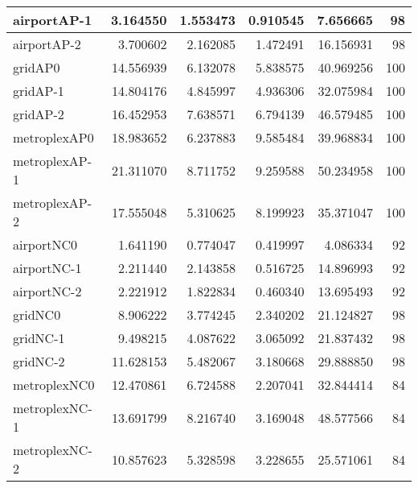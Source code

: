 \begin{longtable}{|l|r|r|r|r|r|}
airportAP-1 & 3.164550 & 1.553473 & 0.910545 & 7.656665 & 98 \\ \hline
airportAP-2 & 3.700602 & 2.162085 & 1.472491 & 16.156931 & 98 \\ \hline
gridAP0 & 14.556939 & 6.132078 & 5.838575 & 40.969256 & 100 \\ \hline
gridAP-1 & 14.804176 & 4.845997 & 4.936306 & 32.075984 & 100 \\ \hline
gridAP-2 & 16.452953 & 7.638571 & 6.794139 & 46.579485 & 100 \\ \hline
metroplexAP0 & 18.983652 & 6.237883 & 9.585484 & 39.968834 & 100 \\ \hline
metroplexAP-1 & 21.311070 & 8.711752 & 9.259588 & 50.234958 & 100 \\ \hline
metroplexAP-2 & 17.555048 & 5.310625 & 8.199923 & 35.371047 & 100 \\ \hline
airportNC0 & 1.641190 & 0.774047 & 0.419997 & 4.086334 & 92 \\ \hline
airportNC-1 & 2.211440 & 2.143858 & 0.516725 & 14.896993 & 92 \\ \hline
airportNC-2 & 2.221912 & 1.822834 & 0.460340 & 13.695493 & 92 \\ \hline
gridNC0 & 8.906222 & 3.774245 & 2.340202 & 21.124827 & 98 \\ \hline
gridNC-1 & 9.498215 & 4.087622 & 3.065092 & 21.837432 & 98 \\ \hline
gridNC-2 & 11.628153 & 5.482067 & 3.180668 & 29.888850 & 98 \\ \hline
metroplexNC0 & 12.470861 & 6.724588 & 2.207041 & 32.844414 & 84 \\ \hline
metroplexNC-1 & 13.691799 & 8.216740 & 3.169048 & 48.577566 & 84 \\ \hline
metroplexNC-2 & 10.857623 & 5.328598 & 3.228655 & 25.571061 & 84 \\ \hline
\end{longtable}
